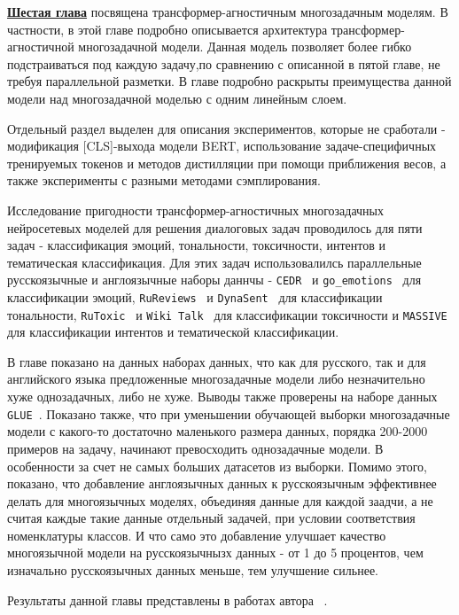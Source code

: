 \underline{\textbf{Шестая глава}} посвящена трансформер-агностичным многозадачным моделям. В частности, в этой главе подробно описывается архитектура трансформер-агностичной многозадачной модели. Данная модель позволяет более гибко подстраиваться под каждую задачу,по сравнению с описанной в пятой главе, не требуя параллельной разметки. В главе подробно раскрыты преимущества данной модели над многозадачной моделью с одним линейным слоем.

Отдельный раздел выделен для описания экспериментов, которые не сработали - модификация [CLS]-выхода модели BERT, использование задаче-специфичных тренируемых токенов и методов дистилляции при помощи приближения весов, а также эксперименты с разными методами сэмплирования. 

Исследование пригодности трансформер-агностичных многозадачных нейросетевых моделей для решения диалоговых задач проводилось для пяти задач - классификация эмоций, тональности, токсичности, интентов и тематическая классификация. Для этих задач использовалилсь параллельные русскоязычные и англоязычные наборы даннчы - \texttt{CEDR}~\cite{cedr} и \texttt{go_emotions}~\cite{go_emotions} для классификации эмоций, \texttt{RuReviews}~\cite{rureviews} и \texttt{DynaSent}~\cite{dynasent} для классификации тональности, \texttt{RuToxic}~\cite{rutoxic} и \texttt{Wiki Talk}~\cite{wikitalk} для классификации токсичности и \texttt{MASSIVE}~\cite{massive} для классификации интентов и тематической классификации.

В главе показано на данных наборах данных, что как для русского, так и для английского языка предложенные многозадачные модели либо незначительно хуже однозадачных, либо не хуже. Выводы также проверены на наборе данных \texttt{GLUE}~\cite{glue}. Показано также, что при уменьшении обучающей выборки многозадачные модели с какого-то достаточно маленького размера данных, порядка 200-2000 примеров на задачу, начинают превосходить однозадачные модели. В особенности за счет не самых больших датасетов из выборки. Помимо этого, показано, что добавление англоязычных данных к русскоязычным эффективнее делать для многоязычных моделях, объединяя данные для каждой заадчи, а не считая каждые такие данные отдельный задачей, при условии соответствия номенклатуры классов. И что само это добавление улучшает качество многоязычной модели на русскоязычнызх данных - от 1 до 5 процентов, чем изначально русскоязычных данных меньше, тем улучшение сильнее.


Результаты данной главы представлены в работах автора ~\cite{rumtl,enmtl}.

